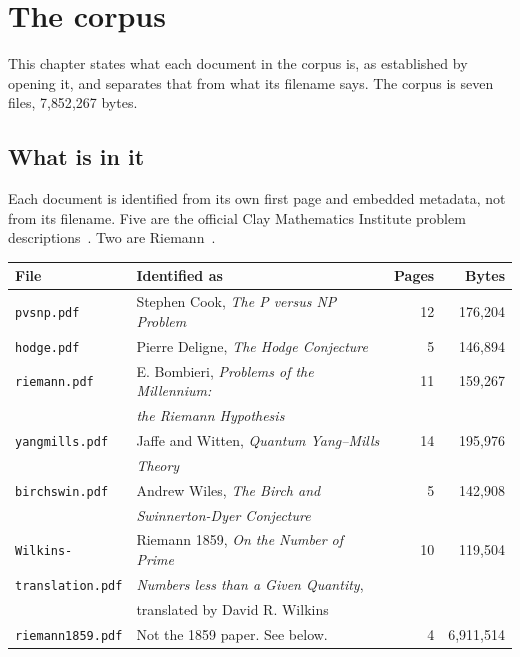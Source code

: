 \chapter{The corpus}

This chapter states what each document in the corpus is, as established by opening it, and separates
that from what its filename says. The corpus is seven files, 7{,}852{,}267 bytes.

\section{What is in it}

Each document is identified from its own first page and embedded metadata, not from its filename.
Five are the official Clay Mathematics Institute problem
descriptions~\cite{src:Cook,src:Deligne,src:Bombieri,src:Jaffe-and-Witten,src:Wiles}. Two are
Riemann~\cite{src:Wilkins-1998,src:Riemann-1859}.

\begin{center}
\begin{tabular}{@{}llrr@{}}
\toprule
File & Identified as & Pages & Bytes \\
\midrule
\texttt{pvsnp.pdf}       & Stephen Cook, \emph{The P versus NP Problem}      & 12 & 176{,}204 \\
\texttt{hodge.pdf}       & Pierre Deligne, \emph{The Hodge Conjecture}       & 5  & 146{,}894 \\
\texttt{riemann.pdf}     & E. Bombieri, \emph{Problems of the Millennium:}   & 11 & 159{,}267 \\
                         & \emph{the Riemann Hypothesis}                     &    &           \\
\texttt{yangmills.pdf}   & Jaffe and Witten, \emph{Quantum Yang--Mills}      & 14 & 195{,}976 \\
                         & \emph{Theory}                                     &    &           \\
\texttt{birchswin.pdf}   & Andrew Wiles, \emph{The Birch and}                & 5  & 142{,}908 \\
                         & \emph{Swinnerton-Dyer Conjecture}                 &    &           \\
\texttt{Wilkins-}        & Riemann 1859, \emph{On the Number of Prime}       & 10 & 119{,}504 \\
\texttt{translation.pdf} & \emph{Numbers less than a Given Quantity},         &    &           \\
                         & translated by David R. Wilkins                    &    &           \\
\texttt{riemann1859.pdf} & Not the 1859 paper. See below.                    & 4  & 6{,}911{,}514 \\
\bottomrule
\end{tabular}
\end{center}

